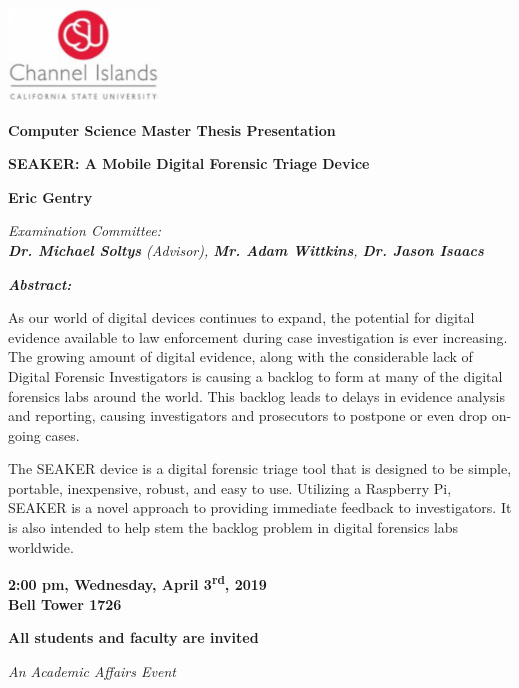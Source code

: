 \documentclass{article}
\begin{document}
\begin{center}

\includegraphics[width=0.3\textwidth]{CI_Logo.png}\\

\hfill\break

\LARGE
\textbf{\color{grey}Computer Science Master Thesis Presentation}\\

\hfill\break
\hfill\break

\Large
{\bf SEAKER: A Mobile Digital Forensic Triage Device}\\

\vspace{5mm}

\large
{\bf Eric Gentry}\\

\vspace{5mm}

\large
\textit{ Examination Committee:\\
{\bf Dr. Michael Soltys} (Advisor), {\bf Mr. Adam Wittkins}, {\bf
Dr. Jason Isaacs}}\\

\hfill\break

\end{center}

\begin{adjustwidth}{1in}{1in}
\textit{\bf Abstract:}\\

\vspace{3mm}

\normalsize
\noindent As our world of digital devices continues to
expand, the potential for digital evidence available to
law enforcement during case investigation is ever increasing.
The growing amount of digital evidence, along with the
considerable lack of Digital Forensic Investigators is
causing a backlog to form at many of the digital forensics
labs around the world. This backlog leads to delays in
evidence analysis and reporting, causing investigators and
prosecutors to postpone or even drop on-going cases.

The SEAKER device is a digital forensic triage tool that is
designed to be simple, portable, inexpensive, robust, and
easy to use. Utilizing a Raspberry Pi,
SEAKER is a novel approach to
providing immediate feedback to investigators. It is also
intended to help stem the backlog problem in digital
forensics labs worldwide.
\end{adjustwidth}

\hfill\break

\begin{center}

\LARGE
{\bf 2:00 pm, Wednesday, April 3\textsuperscript{rd}, 2019\\
Bell Tower 1726}\\

\vspace{15mm}

\large
{\bf All students and faculty are invited}\\

\hfill\break

\small
{\it An Academic Affairs Event}

\end{center}
\end{document}
